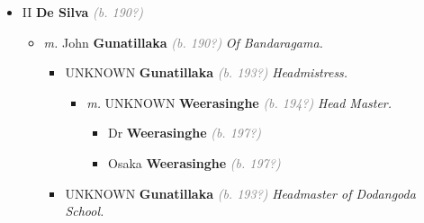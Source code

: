 \documentclass[10pt, openany]{book}
\begin{document}
\begin{itemize}
{\begin{itemize}
{\begin{itemize}
{\begin{itemize}
{\begin{itemize}
{\begin{itemize}
\item{Lorraine \textbf{Senaratna} \textcolor{gray}{\textit{(b. 197?)}} \textcolor{slmaroon}{\textit{Died in Vienna.}}
\begin{itemize}
\item{\textit{m.} Sam \textbf{Lowell} \textcolor{gray}{\textit{(b. 197?)}} \textcolor{slmaroon}{\textit{Austria.}}   \label{couple:00000515:00000744} \begin{itemize}
\item{Suran \textbf{Lowell} \textcolor{gray}{\textit{(b. 200?)}} \textcolor{slmaroon}{\textit{In France.}}
 }
\end{itemize}}
\end{itemize}
 }
\item{Malcolm \textbf{Senaratna} \textcolor{gray}{\textit{(b. 198?)}}
 }
\item{Elane \textbf{Senaratna} \textcolor{gray}{\textit{(b. 198?)}}
 }
\end{itemize}}
\end{itemize}
   }
\end{itemize}}
\end{itemize}
    }
\item{II \textbf{De Silva} \textcolor{gray}{\textit{(b. 190?)}}
\begin{itemize}
\item{\textit{m.} John \textbf{Gunatillaka} \textcolor{gray}{\textit{(b. 190?)}} \textcolor{slmaroon}{\textit{Of Bandaragama.}}   \label{couple:00000148:00000235} \begin{itemize}
\item{UNKNOWN \textbf{Gunatillaka} \textcolor{gray}{\textit{(b. 193?)}} \textcolor{slmaroon}{\textit{Headmistress.}}
\begin{itemize}
\item{\textit{m.} UNKNOWN \textbf{Weerasinghe} \textcolor{gray}{\textit{(b. 194?)}} \textcolor{slmaroon}{\textit{Head Master.}}   \label{couple:00000233:00000933} \begin{itemize}
\item{Dr \textbf{Weerasinghe} \textcolor{gray}{\textit{(b. 197?)}}
 }
\item{Osaka \textbf{Weerasinghe} \textcolor{gray}{\textit{(b. 197?)}}
 }
\end{itemize}}
\end{itemize}
 }
\item{UNKNOWN \textbf{Gunatillaka} \textcolor{gray}{\textit{(b. 193?)}} \textcolor{slmaroon}{\textit{Headmaster of Dodangoda School.}}
 }
\end{itemize}}
\end{itemize}
  }
\end{itemize}}
\end{itemize}
 
\end{document}
